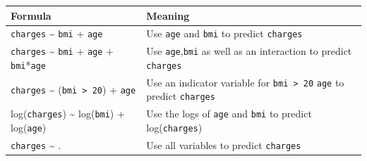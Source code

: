 \documentclass[openany]{book}
\begin{document}
\begin{longtable}[]{@{}ll@{}}
\toprule
\begin{minipage}[b]{0.41\columnwidth}\raggedright
Formula\strut
\end{minipage} & \begin{minipage}[b]{0.53\columnwidth}\raggedright
Meaning\strut
\end{minipage}\tabularnewline
\midrule
\endhead
\begin{minipage}[t]{0.41\columnwidth}\raggedright
\texttt{charges} \textasciitilde{} \texttt{bmi} + \texttt{age}\strut
\end{minipage} & \begin{minipage}[t]{0.53\columnwidth}\raggedright
Use \texttt{age} and \texttt{bmi} to predict \texttt{charges}\strut
\end{minipage}\tabularnewline
\begin{minipage}[t]{0.41\columnwidth}\raggedright
\texttt{charges} \textasciitilde{} \texttt{bmi} + \texttt{age} + \texttt{bmi}*\texttt{age}\strut
\end{minipage} & \begin{minipage}[t]{0.53\columnwidth}\raggedright
Use \texttt{age},\texttt{bmi} as well as an interaction to predict \texttt{charges}\strut
\end{minipage}\tabularnewline
\begin{minipage}[t]{0.41\columnwidth}\raggedright
\texttt{charges} \textasciitilde{} (\texttt{bmi\ \textgreater{}\ 20}) + \texttt{age}\strut
\end{minipage} & \begin{minipage}[t]{0.53\columnwidth}\raggedright
Use an indicator variable for \texttt{bmi\ \textgreater{}\ 20} \texttt{age} to predict \texttt{charges}\strut
\end{minipage}\tabularnewline
\begin{minipage}[t]{0.41\columnwidth}\raggedright
log(\texttt{charges}) \textasciitilde{} log(\texttt{bmi}) + log(\texttt{age})\strut
\end{minipage} & \begin{minipage}[t]{0.53\columnwidth}\raggedright
Use the logs of \texttt{age} and \texttt{bmi} to predict log(\texttt{charges})\strut
\end{minipage}\tabularnewline
\begin{minipage}[t]{0.41\columnwidth}\raggedright
\texttt{charges} \textasciitilde{} .\strut
\end{minipage} & \begin{minipage}[t]{0.53\columnwidth}\raggedright
Use all variables to predict \texttt{charges}\strut
\end{minipage}\tabularnewline
\bottomrule
\end{longtable}
\end{document}
